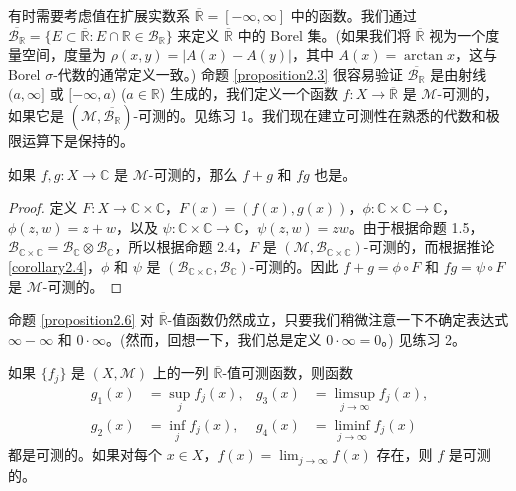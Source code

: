\documentclass[lang=cn,10pt,thmcnt=section]{elegantbook}
\begin{document}
有时需要考虑值在扩展实数系 $\overline{\mathbb{R}} = [-\infty, \infty]$ 中的函数。我们通过 $\overline{\mathcal{B
}_\mathbb{R}} = \{E \subset \overline{\mathbb{R}} : E \cap \mathbb{R} \in \mathcal{B}_\mathbb{R}\}$ 来定义 $\overline{\mathbb{R}}$ 中的 Borel 集。(如果我们将 $\overline{\mathbb{R}}$ 视为一个度量空间，度量为 $\rho(x, y) = |A(x) - A(y)|$，其中 $A(x) = \arctan x$，这与 Borel $\sigma$-代数的通常定义一致。) 命题 \ref{proposition2.3} 很容易验证 $\overline{\mathcal{B}_\mathbb{R}}$ 是由射线 $(a, \infty]$ 或 $[-\infty, a)$ ($a \in \mathbb{R}$) 生成的，我们定义一个函数 $f : X \to \overline{\mathbb{R}}$ 是 $\mathcal{M}$-可测的，如果它是 $(\mathcal{M}, \overline{\mathcal{B}_\mathbb{R}})$-可测的。见练习 1。我们现在建立可测性在熟悉的代数和极限运算下是保持的。
\begin{proposition}\label{proposition2.6}
如果 $f, g : X \to \mathbb{C}$ 是 $\mathcal{M}$-可测的，那么 $f+g$ 和 $fg$ 也是。
\end{proposition}

\begin{proof}
定义 $F : X \to \mathbb{C} \times \mathbb{C}$，$F(x) = (f(x), g(x))$，$\phi : \mathbb{C} \times \mathbb{C} \to \mathbb{C}$，$\phi(z,w) = z+w$，以及 $\psi : \mathbb{C} \times \mathbb{C} \to \mathbb{C}$，$\psi(z,w) = zw$。由于根据命题 1.5，$\mathcal{B}_{\mathbb{C} \times \mathbb{C}} = \mathcal{B}_\mathbb{C} \otimes \mathcal{B}_\mathbb{C}$，所以根据命题 2.4，$F$ 是 $(\mathcal{M}, \mathcal{B}_{\mathbb{C} \times \mathbb{C}})$-可测的，而根据推论 \ref{corollary2.4}，$\phi$ 和 $\psi$ 是 $(\mathcal{B}_{\mathbb{C} \times \mathbb{C}}, \mathcal{B}_\mathbb{C})$-可测的。因此 $f+g = \phi \circ F$ 和 $fg = \psi \circ F$ 是 $\mathcal{M}$-可测的。
\end{proof}

命题 \ref{proposition2.6} 对 $\overline{\mathbb{R}}$-值函数仍然成立，只要我们稍微注意一下不确定表达式 $\infty - \infty$ 和 $0 \cdot \infty$。(然而，回想一下，我们总是定义 $0 \cdot \infty = 0$。) 见练习 2。

\begin{proposition}\label{proposition2.7}
如果 $\{f_j\}$ 是 $(X, \mathcal{M})$ 上的一列 $\overline{\mathbb{R}}$-值可测函数，则函数
\begin{align*}
g_1(x) &= \sup_j f_j(x), & g_3(x) &= \limsup_{j\to\infty} f_j(x), \\
g_2(x) &= \inf_j f_j(x), & g_4(x) &= \liminf_{j\to\infty} f_j(x)
\end{align*}
都是可测的。如果对每个 $x \in X$，$f(x) = \lim_{j\to\infty} f(x)$ 存在，则 $f$ 是可测的。
\end{proposition}
\end{document}
